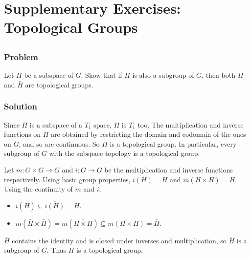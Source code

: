 \section*{Supplementary Exercises: Topological Groups} 
\label{sec-topspace-groups}


\setcounter{subsection}{2} %
\subsection{}

\subsubsection{Problem}
Let $H$ be a subspace of $G$. Show that if $H$ is also a subgroup of $G$, then both $H$ and $\bar H$ are topological groups.

\subsubsection{Solution}
Since $H$ is a subspace of a $T_1$ space, $H$ is $T_1$ too. The multiplication and inverse functions on $H$ are obtained by restricting the domain and codomain of the ones on $G$, and so are continuous. So $H$ is a topological group. In particular, every subgroup of $G$ with the subspace topology is a topological group.

Let $m : G \times G \to G$ and $i : G \to G$ be the multiplication and inverse functions respectively. Using basic group properties, $i(H) = H$ and $m(H \times H) = H$. Using the continuity of $m$ and $i$,
\begin{itemize}
\item $i(\bar H) \subseteq \overline{i(H)} = \bar H$.
\item $m(\bar H \times \bar H) = m(\overline{H \times H}) \subseteq \overline{m(H \times H)} = \bar H$.
\end{itemize}
$\bar H$ contains the identity and is closed under inverses and multiplication, so $\bar H$ is a subgroup of $G$. Thus $\bar H$ is a topological group.


\setcounter{subsection}{4} %
\subsection{}

